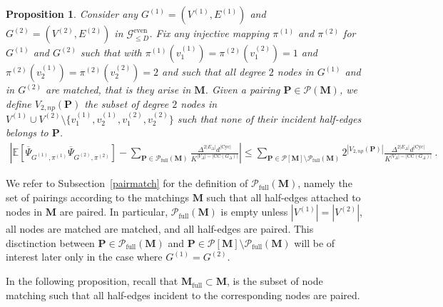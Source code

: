 \documentclass{article}
\newtheorem{proposition}{Proposition}
\begin{document}
\begin{proposition}\label{prop:covariance_general}
    Consider any $G^{(1)}=(V^{(1)},E^{(1)})$ and $G^{(2)}=(V^{(2)},E^{(2)})$ in $\mathcal{G}_{\leq D}^{\mathrm{even}}$. Fix any injective mapping $\pi^{(1)}$ and $\pi^{(2)}$ for $G^{(1)}$ and $G^{(2)}$ such that  with $\pi^{(1)}(v^{(1)}_1)=\pi^{(2)}(v^{(2)}_1)=1$ and   $\pi^{(2)}(v^{(1)}_2)=\pi^{(2)}(v^{(2)}_2)=2$ and such that all degree $2$ nodes in $G^{(1)}$ and in $G^{(2)}$ are matched, that is they arise in $\mathbf{M}$. 
Given a pairing $\mathbf{P}\in \mathcal{P}(\mathbf{M})$, we define $V_{2,np}(\mathbf{P})$ the subset of degree $2$ nodes in $V^{(1)}\cup V^{(2)}\setminus\{v^{(1)}_1,v^{(1)}_2,v^{(2)}_1,v^{(2)}_2\}$ such that none of their incident half-edges belongs to $\mathbf{P}$.
\begin{eqnarray*}
\left|\mathbb{E}[\overline{\Psi}_{G^{(1)},\pi^{(1)}} \overline{\Psi}_{G^{(2)},\pi^{(2)}}] - \sum_{\mathbf{P}\in  \mathcal{P}_{\mathrm{full}}(\mathbf{M})}\frac{\Delta^{2|E_{\Delta}|}d^{|\mathrm{Cyc}|}}{K^{|V_{\Delta}|-|\mathrm{CC}(G_{\Delta})|}}  \right|\leq   \sum_{\mathbf{P}\in \mathcal{P}[\mathbf{M}]\setminus \mathcal{P}_{\mathrm{full}}(\mathbf{M})} 2^{|V_{2,np}(\mathbf{P}) |} \frac{\Delta^{2|E_{\Delta}|}d^{|\mathrm{Cyc}|}}{K^{|V_{\Delta}|-|\mathrm{CC}(G_{\Delta})|}}\ .
\end{eqnarray*}
   \end{proposition}
   We refer to Subsection~\ref{pairmatch} for the definition of $\mathcal{P}_{\mathrm{full}}(\mathbf{M})$, namely the set of pairings according to the matchings $\mathbf M$ such that all half-edges attached to nodes in $\mathbf M$ are paired. In particular, $\mathcal{P}_{\mathrm{full}}(\mathbf{M})$ is empty unless $|V^{(1)}|=|V^{(2)}|$, all nodes are matched are matched, and all half-edges are paired. This disctinction between $\mathbf{P}\in \mathcal{P}_{\mathrm{full}}(\mathbf{M})$ and $\mathbf{P}\in \mathcal{P}[\mathbf{M}]\setminus \mathcal{P}_{\mathrm{full}}(\mathbf{M})$ will be of interest later only in the case where $G^{(1)}=G^{(2)}$. 




   In the following proposition, recall that $\mathbf{M}_{\mathrm{full}}\subset \mathbf{M}$, is the subset of node matching such that all half-edges incident to the corresponding nodes are paired.
\end{document}
